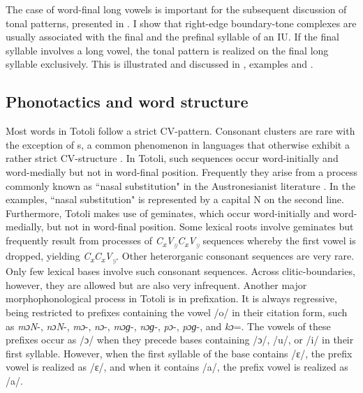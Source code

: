 
The case of word-final long vowels is important for the subsequent discussion of tonal patterns, presented in . I show that right-edge boundary-tone complexes are usually associated with the final and the prefinal syllable of an IU. If the final syllable involves a long vowel, the tonal pattern is realized on the final long syllable exclusively. This is illustrated and discussed in ,  examples   and  .




\subsection[Phonotactics]{Phonotactics and word structure}
\label{sec:phonotactics}


Most words in Totoli follow a strict CV-pattern. Consonant clusters are rare with the exception of  s, a common phenomenon in languages that otherwise exhibit a rather strict CV-structure \citep{Downing_2017, Downing, Reid_ProtoA_NC, riehl2008phonology, Herbert_markedness}. In Totoli, such sequences occur word-initially and word-medially but not in word-final position. Frequently they arise from a process commonly known as ``nasal substitution"  in the Austronesianist  literature \citep{Blust2004, Joe.2004}. In the examples, ``nasal substitution" is represented by a capital N on the second line. Furthermore, Totoli makes use of geminates,  which occur word-initially and word-medially, but not in word-final position. Some lexical roots involve geminates but frequently result from   processes of \textit{C\textsubscript{x}V\textcolor{gray}{\textsubscript{y}}C\textsubscript{x}V\textcolor{gray}{\textsubscript{y}}} sequences whereby the first vowel is dropped, yielding  \textit{C\textsubscript{x}C\textsubscript{x}V\textcolor{gray}{\textsubscript{y}}}. Other heterorganic consonant sequences are very rare. Only  few lexical bases involve such consonant sequences. Across clitic-boundaries, however, they are allowed but are also very infrequent. 
Another major morphophonological process  in Totoli is  in prefixation. It is always regressive, being restricted to prefixes containing the vowel /o/ in their citation form, such as \textit{mɔN}-, \textit{nɔN}-, \textit{mɔ}-, \textit{nɔ}-, \textit{mɔɡ}-, \textit{nɔɡ}-, \textit{pɔ}-, \textit{pɔɡ}-, and \textit{kɔ}=. The vowels of these prefixes occur as /ɔ/ when they precede bases containing /ɔ/, /u/, or /i/ in their first syllable. However, when the first syllable of the base contains /ɛ/, the prefix vowel is realized as /ɛ/, and when it contains /a/, the prefix vowel is realized as /a/. 

